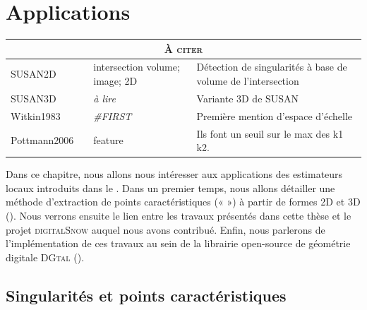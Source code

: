 %
\chapter{Applications}
\label{sec:applications}


\setcounter{minitocdepth}{3}
\minitoc

\newpage

\begin{table}[h]
\begin{tabular}{@{}p{2cm}lp{2cm}p{8cm}@{}}
\toprule
\multicolumn{4}{c}{\textsc{À citer}} \\ \midrule
SUSAN2D & \cite{SUSAN2D} & intersection volume; image; 2D     & Détection de singularités à base de volume de l'intersection \\
SUSAN3D & \cite{SUSAN3D} & \emph{à lire} & Variante 3D de SUSAN \\
Witkin1983 & \cite{Witkin1983} & \emph{\#FIRST} & Première mention d'espace d'échelle \\
Pottmann2006 & \cite{Yang2006} & feature & Ils font un seuil sur le max des k1 k2. \\

\bottomrule
\end{tabular}
\end{table}

\newpage

Dans ce chapitre, nous allons nous intéresser aux applications des estimateurs
locaux introduits dans le . Dans un premier temps,
nous allons détailler une méthode d'extraction de points caractéristiques («
 ») à partir de formes 2D et 3D
().
%
%
Nous verrons ensuite le lien entre les travaux présentés dans cette thèse et le
projet \textsc{digitalSnow} auquel nous avons contribué. Enfin, nous parlerons
de l'implémentation de ces travaux au sein de la librairie open-source de
géométrie digitale \textsc{DGtal} \cite{DGtal}
().
%
\section{Singularités et points caractéristiques}%
\label{sec:applications:feature}
%
